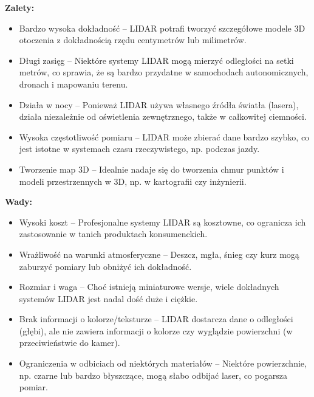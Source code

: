 \documentclass[magisterska]{pracadypl}
\begin{document}
\begin{minipage}[t]{0.45\textwidth}
\textbf{Zalety:}
\begin{itemize}
  \item Bardzo wysoka dokładność – LIDAR potrafi tworzyć szczegółowe modele 3D otoczenia z dokładnością rzędu centymetrów lub milimetrów.

  \item Długi zasięg – Niektóre systemy LIDAR mogą mierzyć odległości na setki metrów, co sprawia, że są bardzo przydatne w samochodach autonomicznych, dronach i mapowaniu terenu.

  \item Działa w nocy – Ponieważ LIDAR używa własnego źródła światła (lasera), działa niezależnie od oświetlenia zewnętrznego, także w całkowitej ciemności.

  \item Wysoka częstotliwość pomiaru – LIDAR może zbierać dane bardzo szybko, co jest istotne w systemach czasu rzeczywistego, np. podczas jazdy.

  \item Tworzenie map 3D – Idealnie nadaje się do tworzenia chmur punktów i modeli przestrzennych w 3D, np. w kartografii czy inżynierii.
\end{itemize}
\end{minipage}
\hfill
\begin{minipage}[t]{0.45\textwidth}
\textbf{Wady:}
\begin{itemize}
  \item Wysoki koszt – Profesjonalne systemy LIDAR są kosztowne, co ogranicza ich zastosowanie w tanich produktach konsumenckich.

  \item Wrażliwość na warunki atmosferyczne – Deszcz, mgła, śnieg czy kurz mogą zaburzyć pomiary lub obniżyć ich dokładność.

  \item Rozmiar i waga – Choć istnieją miniaturowe wersje, wiele dokładnych systemów LIDAR jest nadal dość duże i ciężkie.

  \item Brak informacji o kolorze/teksturze – LIDAR dostarcza dane o odległości (głębi), ale nie zawiera informacji o kolorze czy wyglądzie powierzchni (w przeciwieństwie do kamer).

\item Ograniczenia w odbiciach od niektórych materiałów – Niektóre powierzchnie, np. czarne lub bardzo błyszczące, mogą słabo odbijać laser, co pogarsza pomiar.
\end{itemize}
\end{minipage}
\end{document}
